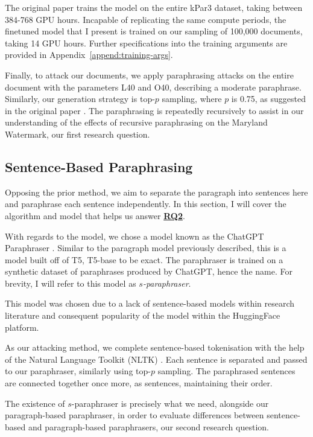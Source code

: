 \documentclass{l4proj}
\theoremstyle{definition}
\newcommand{\codefont}[1]{{\fontfamily{lmtt}\selectfont #1}}
\begin{document}
        The original paper trains the model on the entire kPar3 dataset, taking between 384-768 GPU hours. Incapable of replicating the same compute periods, the finetuned model that I present is trained on our sampling of 100,000 documents, taking 14 GPU hours. Further specifications into the training arguments are provided in Appendix~\ref{append:training-args}. 

        Finally, to attack our documents, we apply paraphrasing attacks on the entire document with the parameters L40 and O40, describing a moderate paraphrase. Similarly, our generation strategy is top-$p$ sampling, where $p$ is 0.75, as suggested in the original paper \citep{krishna2023paraphrasing}. The paraphrasing is repeatedly recursively to assist in our understanding of the effects of recursive paraphrasing on the Maryland Watermark, our first research question.

        
    \subsection{Sentence-Based Paraphrasing}
        Opposing the prior method, we aim to separate the paragraph into sentences here and paraphrase each sentence independently. In this section, I will cover the algorithm and model that helps us answer \hyperref[sec:research-questions]{\textbf{RQ2}}.

        With regards to the model, we chose a model known as the \codefont{ChatGPT Paraphraser} \citep{chatgpt_paraphraser}. Similar to the paragraph model previously described, this is a model built off of T5, \codefont{T5-base} to be exact. The paraphraser is trained on a synthetic dataset of paraphrases produced by ChatGPT, hence the name. For brevity, I will refer to this model as \emph{$s$-paraphraser}.

        This model was chosen due to a lack of sentence-based models within research literature and consequent popularity of the model within the HuggingFace platform.

        As our attacking method, we complete sentence-based tokenisation with the help of the Natural Language Toolkit (NLTK) \citep{bird2009natural}. Each sentence is separated and passed to our paraphraser, similarly using top-$p$ sampling. The paraphrased sentences are connected together once more, as sentences, maintaining their order.

        The existence of $s$-paraphraser is precisely what we need, alongside our paragraph-based paraphraser, in order to evaluate differences between sentence-based and paragraph-based paraphrasers, our second research question.
    
\end{document}
